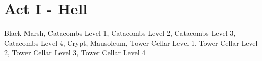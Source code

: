 
\section{Act I - Hell}

Black Marsh, Catacombs Level 1, Catacombs Level 2, Catacombs Level 3, Catacombs Level 4, Crypt, Mausoleum, Tower Cellar Level 1, Tower Cellar Level 2, Tower Cellar Level 3, Tower Cellar Level 4\\

